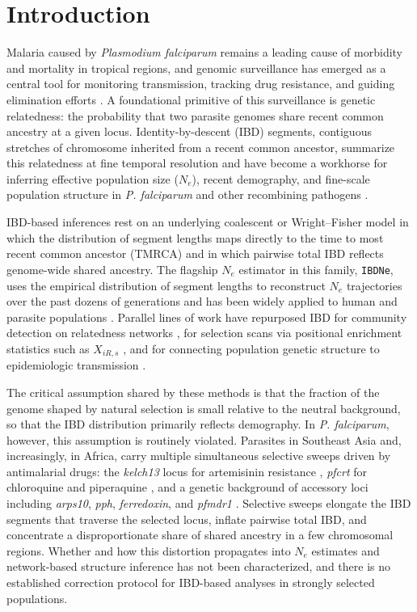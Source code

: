 \section{Introduction}

Malaria caused by \textit{Plasmodium falciparum} remains a leading cause of morbidity and mortality in tropical regions, and genomic surveillance has emerged as a central tool for monitoring transmission, tracking drug resistance, and guiding elimination efforts \citep{who2022worldmalaria,malariagen2021pf6}. A foundational primitive of this surveillance is genetic relatedness: the probability that two parasite genomes share recent common ancestry at a given locus. Identity-by-descent (IBD) segments, contiguous stretches of chromosome inherited from a recent common ancestor, summarize this relatedness at fine temporal resolution and have become a workhorse for inferring effective population size ($N_e$), recent demography, and fine-scale population structure in \textit{P. falciparum} and other recombining pathogens \citep{schaffner2018hmmibd,henden2018isorelate,taylor2019ibd}.

IBD-based inferences rest on an underlying coalescent or Wright--Fisher model in which the distribution of segment lengths maps directly to the time to most recent common ancestor (TMRCA) and in which pairwise total IBD reflects genome-wide shared ancestry. The flagship $N_e$ estimator in this family, \texttt{IBDNe}, uses the empirical distribution of segment lengths to reconstruct $N_e$ trajectories over the past dozens of generations and has been widely applied to human and parasite populations \citep{browning2015ibdne,daniels2015modeling}. Parallel lines of work have repurposed IBD for community detection on relatedness networks \citep{rosvall2008maps}, for selection scans via positional enrichment statistics such as $X_{iR,s}$ \citep{henden2018xirs}, and for connecting population genetic structure to epidemiologic transmission \citep{chang2019mapping,wong2017genetic}.

The critical assumption shared by these methods is that the fraction of the genome shaped by natural selection is small relative to the neutral background, so that the IBD distribution primarily reflects demography. In \textit{P. falciparum}, however, this assumption is routinely violated. Parasites in Southeast Asia and, increasingly, in Africa, carry multiple simultaneous selective sweeps driven by antimalarial drugs: the \textit{kelch13} locus for artemisinin resistance \citep{ariey2014kelch13,ashley2014tracking}, \textit{pfcrt} for chloroquine and piperaquine \citep{fidock2000pfcrt,amato2017piperaquine}, and a genetic background of accessory loci including \textit{arps10}, \textit{pph}, \textit{ferredoxin}, and \textit{pfmdr1} \citep{miotto2015genetic}. Selective sweeps elongate the IBD segments that traverse the selected locus, inflate pairwise total IBD, and concentrate a disproportionate share of shared ancestry in a few chromosomal regions. Whether and how this distortion propagates into $N_e$ estimates and network-based structure inference has not been characterized, and there is no established correction protocol for IBD-based analyses in strongly selected populations.

